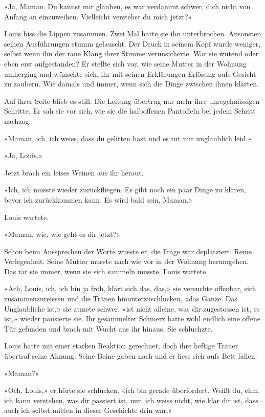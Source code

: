«Ja, Maman. Du kannst mir glauben, es war verdammt schwer, dich nicht
von Anfang an einzuweihen. Vielleicht verstehst du mich jetzt?»

Louis biss die Lippen zusammen. Zwei Mal hatte sie ihn unterbrochen.
Ansonsten seinen Ausführungen stumm gelauscht. Der Druck in seinem Kopf
wurde weniger, selbst wenn ihn der raue Klang ihrer Stimme
verunsicherte. War sie wütend oder eben erst aufgestanden? Er stellte
sich vor, wie seine Mutter in der Wohnung umherging und wünschte sich,
ihr mit seinen Erklärungen Erlösung aufs Gesicht zu zaubern. Wie damals
und immer, wenn sich die Dinge zwischen ihnen klärten.

Auf ihrer Seite blieb es still. Die Leitung übertrug nur mehr ihre
unregelmässigen Schritte. Er sah sie vor sich, wie sie die halboffenen
Pantoffeln bei jedem Schritt nachzog.

«Maman, ich, ich weiss, dass du gelitten hast und es tut mir unglaublich
leid.»

«Ja, Louis.»

Jetzt brach ein leises Weinen aus ihr heraus.

«Ich, ich musste wieder zurückfliegen. Es gibt noch ein paar Dinge zu
klären, bevor ich zurückkommen kann. Es wird bald sein, Maman.»

Louis wartete.

«Maman, wie, wie geht es dir jetzt?»

Schon beim Aussprechen der Worte wusste er, die Frage war deplatziert.
Reine Verlegenheit. Seine Mutter musste nach wie vor in der Wohnung
herumgehen. Das tat sie immer, wenn sie sich sammeln musste. Louis
wartete.

«Ach, Louis, ich, ich bin ja froh, klärt sich das, das,» sie versuchte
offenbar, sich zusammenzureissen und die Tränen hinunterzuschlucken,
«das Ganze. Das Unglaubliche ist,» sie atmete schwer, «ist nicht
alleine, was dir zugestossen ist, es ist,» wieder pausierte sie. Ihr
gesammelter Schmerz hatte wohl endlich eine offene Tür gefunden und
brach mit Wucht aus ihr hinaus. Sie schluchzte.

Louis hatte mit einer starken Reaktion gerechnet, doch ihre heftige
Trauer übertraf seine Ahnung. Seine Beine gaben nach und er liess sich
aufs Bett fallen.

«Maman?»

«Och, Louis,» er hörte sie schlucken, «ich bin gerade überfordert. Weißt
du, ehm, ich kann verstehen, was dir passiert ist, nur, ich weiss nicht,
wie klar dir ist, dass auch ich selbst mitten in dieser Geschichte drin
war.»

